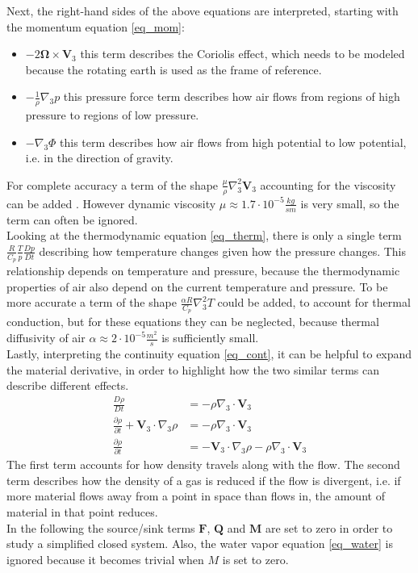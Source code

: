 Next, the right-hand sides of the above equations are interpreted, starting with the momentum equation \ref{eq_mom}:
\begin{itemize}
\item $-2\boldsymbol{\Omega}\times \textbf{V}_3$ this term describes the Coriolis effect, which needs to be modeled because the rotating earth is used as the frame of reference.
\item $- \frac{1}{\rho}\nabla _3 p$ this pressure force term describes how air flows from regions of high pressure to regions of low pressure.
\item $- \nabla _3 \Phi$ this term describes how air flows from high  potential to low potential, i.e. in the direction of gravity.
\end{itemize}
For complete accuracy a term of the shape $\frac{\mu}{\rho} \nabla _3^2 \textbf{V}_3$ accounting for the viscosity can be added \cite{cabralnsthermo}.
However dynamic viscosity $\mu \approx 1.7\cdot 10^{-5}\frac{kg}{sm}$\cite{cengel2010fluid} is very small, so the term can often be ignored.
\\
Looking at the thermodynamic equation \ref{eq_therm}, there is only a single term $\frac{R}{C_p}\frac{T}{p}\frac{Dp}{Dt}$ describing how temperature changes given how the pressure changes.
This relationship depends on temperature and pressure, because the thermodynamic properties of air also depend on the current temperature and pressure.
To be more accurate a term of the shape $\frac{\alpha R}{C_p}\nabla _3^2 T$ could be added, to account for thermal conduction, but for these equations they can be neglected, because thermal diffusivity of air $\alpha \approx 2\cdot 10^{-5}\frac{m^2}{s}$ \cite{cengel2010fluid} is sufficiently small.
\\
Lastly, interpreting the continuity equation \ref{eq_cont}, it can be helpful to expand the material derivative, in order to highlight how the two similar terms can describe different effects.
\begin{align*}
\frac{D\rho}{Dt} &= -\rho \nabla _3 \cdot \textbf{V}_3\\
\frac{\partial \rho}{\partial t} + \textbf{V}_3 \cdot \nabla _3 \rho &= -\rho \nabla _3 \cdot \textbf{V}_3\\
\frac{\partial \rho}{\partial t} &=  - \textbf{V}_3 \cdot \nabla _3 \rho -\rho \nabla _3 \cdot \textbf{V}_3
\end{align*}
The first term accounts for how density travels along with the flow.
The second term describes how the density of a gas is reduced if the flow is divergent, i.e. if more material flows away from a point in space than flows in, the amount of material in that point reduces.
\\
In the following the source/sink terms $\textbf{F}$, $\textbf{Q}$ and $\textbf{M}$ are set to zero in order to study a simplified closed system.
Also, the water vapor equation \ref{eq_water} is ignored because it becomes trivial when $M$ is set to zero.

